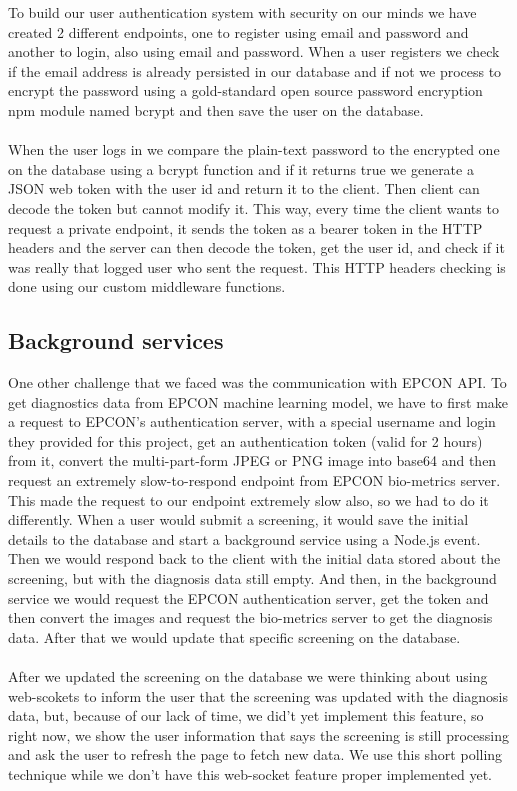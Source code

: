 To build our user authentication system with security on our minds we have created 2 different endpoints, one to register using email and password and another to login, also using email and password. When a user registers we check if the email address is already persisted in our database and if not we process to encrypt the password using a gold-standard open source password encryption npm module named bcrypt and then save the user on the database.
\\ \\
When the user logs in we compare the plain-text password to the encrypted one on the database using a bcrypt function and if it returns true we generate a JSON web token with the user id and return it to the client. Then client can decode the token but cannot modify it. This way, every time the client wants to request a private endpoint, it sends the token as a bearer token in the HTTP headers and the server can then decode the token, get the user id, and check if it was really that logged user who sent the request. This HTTP headers checking is done using our custom middleware functions.

\subsection{Background services}

One other challenge that we faced was the communication with EPCON API. To get diagnostics data from EPCON machine learning model, we have to first make a request to EPCON's authentication server, with a special username and login they provided for this project, get an authentication token (valid for 2 hours) from it, convert the multi-part-form JPEG or PNG image into base64 and then request an extremely slow-to-respond endpoint from EPCON bio-metrics server. This made the request to our endpoint extremely slow also, so we had to do it differently. When a user would submit a screening, it would save the initial details to the database and start a background service using a Node.js event. Then we would respond back to the client with the initial data stored about the screening, but with the diagnosis data still empty. And then, in the background service we would request the EPCON authentication server, get the token and then convert the images and request the bio-metrics server to get the diagnosis data. After that we would update that specific screening on the database.
\\ \\
After we updated the screening on the database we were thinking about using web-scokets to inform the user that the screening was updated with the diagnosis data, but, because of our lack of time, we did't yet implement this feature, so right now, we show the user information that says the screening is still processing and ask the user to refresh the page to fetch new data. We use this short polling technique while we don't have this web-socket feature proper implemented yet.



